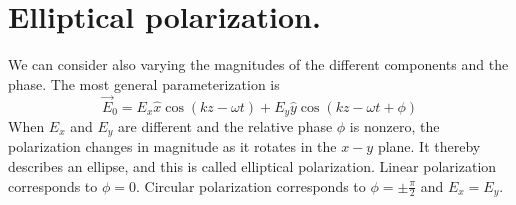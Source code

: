 \section{Elliptical polarization.}
We can consider also varying the magnitudes of the different components and the phase. The most general parameterization is
 $$\vec{E}_{0}=E_{x} \hat{x} \cos (k z-\omega t)+E_{y} \hat{y} \cos (k z-\omega t+\phi)$$
 When $E_{x}$ and $E_{y}$ are different and the relative phase $\phi$ is nonzero, the polarization changes in magnitude as it rotates in the $x-y$ plane. It thereby describes an ellipse, and this is called elliptical polarization. Linear polarization corresponds to $\phi=0$. Circular polarization corresponds to $\phi=\pm \frac{\pi}{2}$ and $E_{x}=E_{y}$.
 
 
 
 
 
 
 
 
 
 
 
 
 
 
 
 
 
 
 
 
 
 
 
 
 
 
 
 
 
 
 
 
 
 
 
 
 
 
 
 
 
 
 
 
 
 
 
 
 
 
 
 
 
 
 
 
 
 
 
 
 
 
 
 
 
